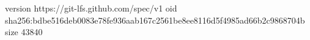 version https://git-lfs.github.com/spec/v1
oid sha256:bdbe516deb0083e78fe936aab167c2561be8ee8116d5f4985ad66b2c9868704b
size 43840
